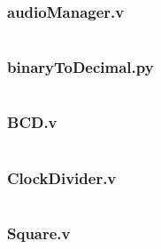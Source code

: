 \documentclass{article}
\begin{document}
\subsubsection{audioManager.v}
\inputminted[linenos]{verilog}{../../src/audioManager.v}
\subsubsection{binaryToDecimal.py}
\inputminted[linenos]{python}{../../assets/binaryToDecimal.py}
\subsubsection{BCD.v}
\inputminted[linenos]{verilog}{../../src/BCD.v}
\subsubsection{ClockDivider.v}
\inputminted[linenos]{verilog}{../../src/ClockDivider.v}
\subsubsection{Square.v}
\inputminted[linenos]{verilog}{../../src/Square.v}
\end{document}
